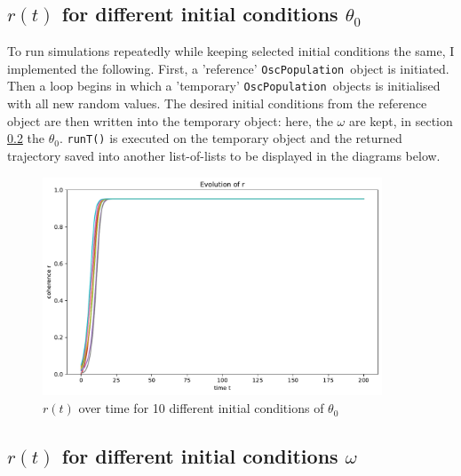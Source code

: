 \documentclass[11pt,a4paper]{article}
\newcommand{\oscpop}{\texttt{OscPopulation}~}
\newcommand{\code}[1]{\texttt{#1}}
\begin{document}
\subsection{$r(t)$ for different initial conditions $\theta_0$}

To run simulations repeatedly while keeping selected initial conditions the same, I implemented the following. 
First, a 'reference' \oscpop object is initiated. 
Then a loop begins in which a 'temporary' \oscpop objects is initialised with all new random values. 
The desired initial conditions from the reference object are then written into the temporary object: here, the $\omega$ are kept, in section \ref{keepthetas} the $\theta_0$. 
\code{runT()} is executed on the temporary object and the returned trajectory saved into another list-of-lists to be displayed in the diagrams below.



\begin{figure}[H]
	\centering
	\includegraphics[width=0.9\textwidth]{graphics/4_t-vs-r_fixedOmegas_omegaDistr=uniform_N=2000_1611570486.pdf}
	\caption{$r(t)$ over time for 10 different initial conditions of $\theta_0$}
	\label{4}
\end{figure}






\subsection{$r(t)$ for different initial conditions $\omega$}\label{keepthetas}
\end{document}
